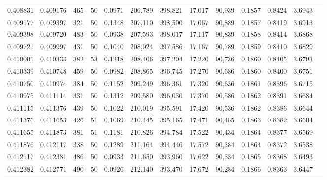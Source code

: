 \begin{tabular}{rrrrrrrrrrrrr}
0.408831 & 0.409176 &   465 &  50 &                                     0.0971 & 206,789 & 398,821 &  17,017 &  90,939 & 0.1857 & 0.8424 & 3.6943 \\
0.409177 & 0.409397 &   321 &  50 &                                     0.1348 & 207,110 & 398,500 &  17,067 &  90,889 & 0.1857 & 0.8419 & 3.6913 \\
0.409398 & 0.409720 &   483 &  50 &                                     0.0938 & 207,593 & 398,017 &  17,117 &  90,839 & 0.1858 & 0.8414 & 3.6868 \\
0.409721 & 0.409997 &   431 &  50 &                                     0.1040 & 208,024 & 397,586 &  17,167 &  90,789 & 0.1859 & 0.8410 & 3.6829 \\
0.410001 & 0.410333 &   382 &  53 &                                     0.1218 & 208,406 & 397,204 &  17,220 &  90,736 & 0.1860 & 0.8405 & 3.6793 \\
0.410339 & 0.410748 &   459 &  50 &                                     0.0982 & 208,865 & 396,745 &  17,270 &  90,686 & 0.1860 & 0.8400 & 3.6751 \\
0.410750 & 0.410974 &   384 &  50 &                                     0.1152 & 209,249 & 396,361 &  17,320 &  90,636 & 0.1861 & 0.8396 & 3.6715 \\
0.410975 & 0.411114 &   331 &  50 &                                     0.1312 & 209,580 & 396,030 &  17,370 &  90,586 & 0.1862 & 0.8391 & 3.6684 \\
0.411115 & 0.411376 &   439 &  50 &                                     0.1022 & 210,019 & 395,591 &  17,420 &  90,536 & 0.1862 & 0.8386 & 3.6644 \\
0.411376 & 0.411653 &   426 &  51 &                                     0.1069 & 210,445 & 395,165 &  17,471 &  90,485 & 0.1863 & 0.8382 & 3.6604 \\
0.411655 & 0.411873 &   381 &  51 &                                     0.1181 & 210,826 & 394,784 &  17,522 &  90,434 & 0.1864 & 0.8377 & 3.6569 \\
0.411876 & 0.412117 &   338 &  50 &                                     0.1289 & 211,164 & 394,446 &  17,572 &  90,384 & 0.1864 & 0.8372 & 3.6538 \\
0.412117 & 0.412381 &   486 &  50 &                                     0.0933 & 211,650 & 393,960 &  17,622 &  90,334 & 0.1865 & 0.8368 & 3.6493 \\
0.412382 & 0.412771 &   490 &  50 &                                     0.0926 & 212,140 & 393,470 &  17,672 &  90,284 & 0.1866 & 0.8363 & 3.6447 \\

\end{tabular}
